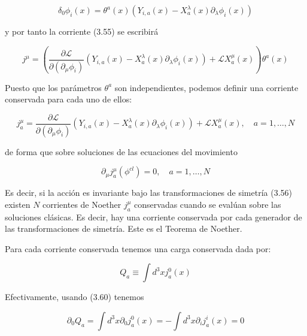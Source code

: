 \begin{equation*}
\delta_{0} \phi_{i}(x)=\theta^{a}(x)\left(Y_{i, a}(x)-X_{a}^{\lambda}(x) \partial_{\lambda} \phi_{i}(x)\right) \tag{3.57}
\end{equation*}

y por tanto la corriente (3.55) se escribirá

\begin{equation*}
j^{\mu}=\left(\frac{\partial \mathscr{L}}{\partial\left(\partial_{\mu} \phi_{i}\right)}\left(Y_{i, a}(x)-X_{a}^{\lambda}(x) \partial_{\lambda} \phi_{i}(x)\right)+\mathscr{L} X_{a}^{\mu}(x)\right) \theta^{a}(x) \tag{3.58}
\end{equation*}


Puesto que los parámetros $\theta^{a}$ son independientes, podemos definir una corriente conservada para cada uno de ellos:

\begin{equation*}
j_{a}^{\mu}=\frac{\partial \mathscr{L}}{\partial\left(\partial_{\mu} \phi_{i}\right)}\left(Y_{i, a}(x)-X_{a}^{\lambda}(x) \partial_{\lambda} \phi_{i}(x)\right)+\mathscr{L} X_{a}^{\mu}(x), \quad a=1, \ldots, N \tag{3.59}
\end{equation*}

de forma que sobre soluciones de las ecuaciones del movimiento

\begin{equation*}
\partial_{\mu} j_{a}^{\mu}\left(\phi^{c l}\right)=0, \quad a=1, \ldots, N \tag{3.60}
\end{equation*}


Es decir, si la acción es invariante bajo las transformaciones de simetría (3.56) existen $N$ corrientes de Noether $j_{a}^{\mu}$ conservadas cuando se evalúan sobre las soluciones clásicas. Es decir, hay una corriente conservada por cada generador de las transformaciones de simetría. Este es el Teorema de Noether.

Para cada corriente conservada tenemos una carga conservada dada por:

\begin{equation*}
Q_{a} \equiv \int d^{3} x j_{a}^{0}(x) \tag{3.61}
\end{equation*}


Efectivamente, usando (3.60) tenemos

\begin{equation*}
\partial_{0} Q_{a}=\int d^{3} x \partial_{0} j_{a}^{0}(x)=-\int d^{3} x \partial_{i} j_{a}^{i}(x)=0 \tag{3.62}
\end{equation*}

